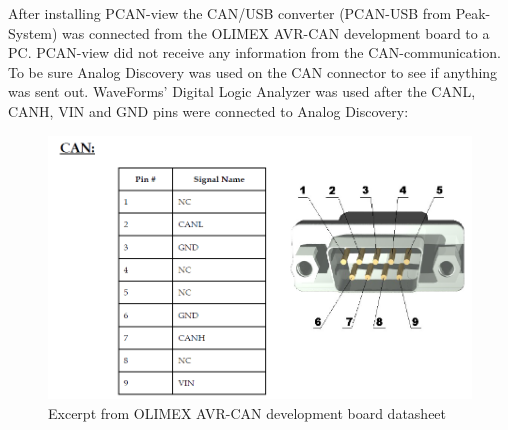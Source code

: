 After installing PCAN-view the CAN/USB converter (PCAN-USB from Peak-System) was connected from the OLIMEX AVR-CAN development board to a PC. PCAN-view did not receive any information from the CAN-communication. To be sure Analog Discovery was used on the CAN connector to see if anything was sent out. WaveForms' Digital Logic Analyzer was used after the CANL, CANH, VIN and GND pins were connected to Analog Discovery:\\
\begin{figure}[H]
	\centering
	\includegraphics[width=0.5\linewidth]{Software/SnipFromOlimexDatasheet.PNG}
	\caption{Excerpt from OLIMEX AVR-CAN development board datasheet}
	\label{fig:OLIMEX_AVR-CAN_BMS}
\end{figure}

